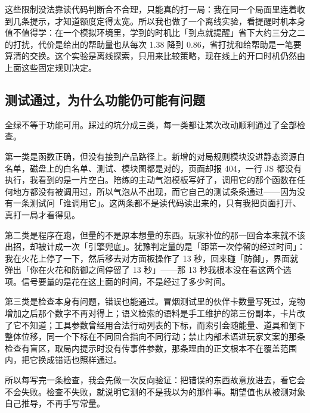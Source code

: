 这些限制没法靠读代码判断合不合理，只能真的打一局：我在同一个局面里连着收到几条提示，才知道额度定得太宽。所以我也做了一个离线实验，看提醒时机本身值不值得学：在一个模拟环境里，学到的时机比「到点就提醒」省下大约三分之二的打扰，代价是给出的帮助量也从每次 1.38 降到 0.86，省打扰和给帮助是一笔要算清的交换。这个实验是离线探索，只用来比较策略，现在线上的开口时机仍然由上面这些固定规则决定。

\subsection{测试通过，为什么功能仍可能有问题}

 全绿不等于功能可用。踩过的坑分成三类，每一类都让某次改动顺利通过了全部检查。

第一类是函数正确，但没有接到产品路径上。新增的对局规则模块没进静态资源白名单，磁盘上的白名单、测试、模块图都是对的，页面却报 404，一行 JS 都没有执行，我看到的是一片空白。陪练的主动气泡模板写好了，调用它的那个函数在任何地方都没有被调用过，所以气泡从不出现，而它自己的测试条条通过——因为没有一条测试问「谁调用它」。这两条都不是读代码读出来的，只有我把页面打开、真打一局才看得见。

第二类是程序在跑，但量的不是原本想量的东西。玩家补位的那一回合本来就不该出招，却被计成一次「引擎兜底」。犹豫判定量的是「距第一次停留的经过时间」：我在火花上停了一下，然后移去对方面板操作了 13 秒，回来碰「防御」，界面就弹出「你在火花和防御之间停留了 13 秒」——那 13 秒我根本没在看这两个选项。信号要量的是花在这上面的时间，不是经过了多少时间。

第三类是检查本身有问题，错误也能通过。冒烟测试里的伙伴卡数量写死过，宠物增加之后那个数字不再对得上；语义检索的语料是手工维护的第三份副本，卡片改了它不知道；工具参数曾经用合法行动列表的下标，而索引会随能量、道具和倒下整体位移，同一个下标在不同回合指向不同行动；禁止内部术语进玩家文案的那条检查有盲区，取局内提示时没有传事件参数，那条理由的正文根本不在覆盖范围内，把它换成错话也照样通过。

所以每写完一条检查，我会先做一次反向验证：把错误的东西故意放进去，看它会不会失败。检查不失败，就说明它测的不是我以为的那件事。期望值也从被测对象自己推导，不再手写常量。
